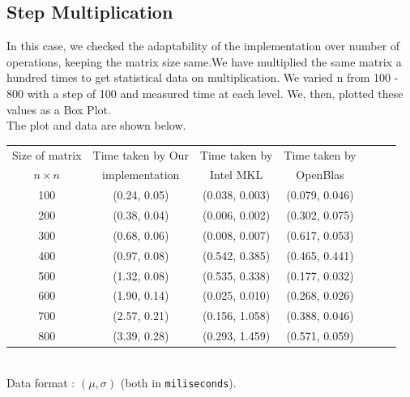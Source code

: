 \documentclass{article}
\begin{document}
        \subsection*{Step Multiplication}
        {
            In this case, we checked the adaptability of the implementation over number of operations, keeping the matrix size same.We have multiplied the same matrix a hundred times to get statistical data on multiplication. We varied n from 100 - 800 with a step of 100 and measured time at each level. We, then, plotted these values as a Box Plot.
        }   \\[5pt] The plot and data are shown below.\\
        \begin{center}
            \begin{tabular}{|c||c|c|c|c|c|c|}
                 \hline
                 {\small Size of matrix} & {\small Time taken by Our}  & {\small Time taken by}  & {\small Time taken by} \\
                 {\small \(n \times n\)} & {\small implementation} & {\small Intel MKL} & {\small OpenBlas}\\
                 \hline
                 \hline
                 100 & (0.24, 0.05) & (0.038, 0.003) & (0.079, 0.046)\\
                 \hline
                 200 & (0.38, 0.04) & (0.006, 0.002) & (0.302, 0.075)\\
                 \hline
                 300 & (0.68, 0.06) & (0.008, 0.007) & (0.617, 0.053)\\
                 \hline
                 400 & (0.97, 0.08) & (0.542, 0.385) & (0.465, 0.441)\\
                 \hline
                 500 & (1.32, 0.08) & (0.535, 0.338) & (0.177, 0.032)\\
                 \hline
                 600 & (1.90, 0.14) & (0.025, 0.010) & (0.268, 0.026)\\
                 \hline
                 700 & (2.57, 0.21) & (0.156, 1.058) & (0.388, 0.046)\\
                 \hline
                 800 & (3.39, 0.28) & (0.293, 1.459) & (0.571, 0.059)\\
                 \hline
            \end{tabular}
            \\[10pt] Data format : \((\mu, \sigma)\) (both in \texttt{miliseconds}).
        \end{center}
        
\end{document}
